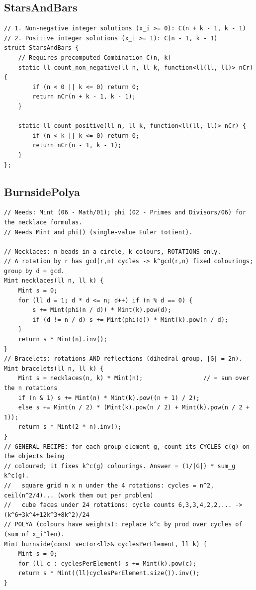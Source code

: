 \documentclass[9pt,a4paper,twocolumn]{extarticle}
\begin{document}
\filbreak
\subsection{StarsAndBars}
\nopagebreak
\begin{lstlisting}
// 1. Non-negative integer solutions (x_i >= 0): C(n + k - 1, k - 1)
// 2. Positive integer solutions (x_i >= 1): C(n - 1, k - 1)
struct StarsAndBars {
    // Requires precomputed Combination C(n, k)
    static ll count_non_negative(ll n, ll k, function<ll(ll, ll)> nCr) {
        if (n < 0 || k <= 0) return 0;
        return nCr(n + k - 1, k - 1);
    }

    static ll count_positive(ll n, ll k, function<ll(ll, ll)> nCr) {
        if (n < k || k <= 0) return 0;
        return nCr(n - 1, k - 1);
    }
};
\end{lstlisting}

\filbreak
\subsection{BurnsidePolya}
\nopagebreak
\begin{lstlisting}
// Needs: Mint (06 - Math/01); phi (02 - Primes and Divisors/06) for the necklace formulas.
// Needs Mint and phi() (single-value Euler totient).

// Necklaces: n beads in a circle, k colours, ROTATIONS only.
// A rotation by r has gcd(r,n) cycles -> k^gcd(r,n) fixed colourings; group by d = gcd.
Mint necklaces(ll n, ll k) {
    Mint s = 0;
    for (ll d = 1; d * d <= n; d++) if (n % d == 0) {
        s += Mint(phi(n / d)) * Mint(k).pow(d);
        if (d != n / d) s += Mint(phi(d)) * Mint(k).pow(n / d);
    }
    return s * Mint(n).inv();
}
// Bracelets: rotations AND reflections (dihedral group, |G| = 2n).
Mint bracelets(ll n, ll k) {
    Mint s = necklaces(n, k) * Mint(n);                 // = sum over the n rotations
    if (n & 1) s += Mint(n) * Mint(k).pow((n + 1) / 2);
    else s += Mint(n / 2) * (Mint(k).pow(n / 2) + Mint(k).pow(n / 2 + 1));
    return s * Mint(2 * n).inv();
}
// GENERAL RECIPE: for each group element g, count its CYCLES c(g) on the objects being
// coloured; it fixes k^c(g) colourings. Answer = (1/|G|) * sum_g k^c(g).
//   square grid n x n under the 4 rotations: cycles = n^2, ceil(n^2/4)... (work them out per problem)
//   cube faces under 24 rotations: cycle counts 6,3,3,4,2,2,... -> (k^6+3k^4+12k^3+8k^2)/24
// POLYA (colours have weights): replace k^c by prod over cycles of (sum of x_i^len).
Mint burnside(const vector<ll>& cyclesPerElement, ll k) {
    Mint s = 0;
    for (ll c : cyclesPerElement) s += Mint(k).pow(c);
    return s * Mint((ll)cyclesPerElement.size()).inv();
}
\end{lstlisting}
\end{document}
